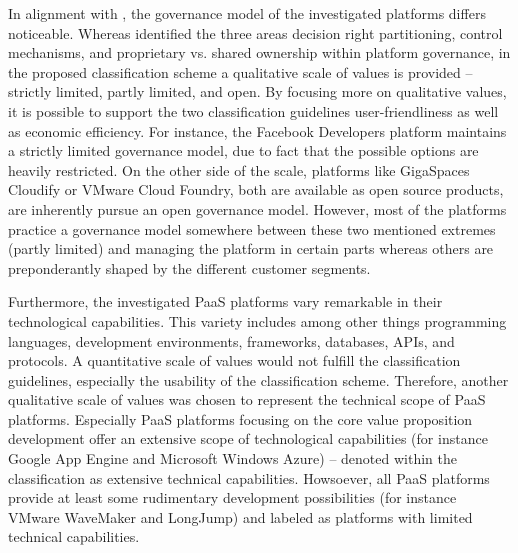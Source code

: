 In alignment with \citet{Tiwana2010}, the governance model of the investigated platforms differs noticeable. Whereas \citet[pp. 679-681]{Tiwana2010} identified the three areas decision right partitioning, control mechanisms, and proprietary vs. shared ownership within platform governance, in the proposed classification scheme a qualitative scale of values is provided -- strictly limited, partly limited, and open. By focusing more on qualitative values, it is possible to support the two classification guidelines user-friendliness as well as economic efficiency. For instance, the Facebook Developers platform maintains a strictly limited governance model, due to fact that the possible options are heavily restricted. On the other side of the scale, platforms like GigaSpaces Cloudify or VMware Cloud Foundry, both are available as open source products, are inherently pursue an open governance model. However, most of the platforms practice a governance model somewhere between these two mentioned extremes (partly limited) and managing the platform in certain parts whereas others are preponderantly shaped by the different customer segments.

Furthermore, the investigated \ac{PaaS} platforms vary remarkable in their technological capabilities. This variety includes among other things programming languages, development environments, frameworks, databases, \acp{API}, and protocols. A quantitative scale of values would not fulfill the classification guidelines, especially the usability of the classification scheme. Therefore, another qualitative scale of values was chosen to represent the technical scope of \ac{PaaS} platforms. Especially \ac{PaaS} platforms focusing on the core value proposition development offer an extensive scope of technological capabilities (for instance Google App Engine and Microsoft Windows Azure) -- denoted within the classification as extensive technical capabilities. Howsoever, all \ac{PaaS} platforms provide at least some rudimentary development possibilities (for instance VMware WaveMaker and LongJump) and labeled as platforms with limited technical capabilities.

